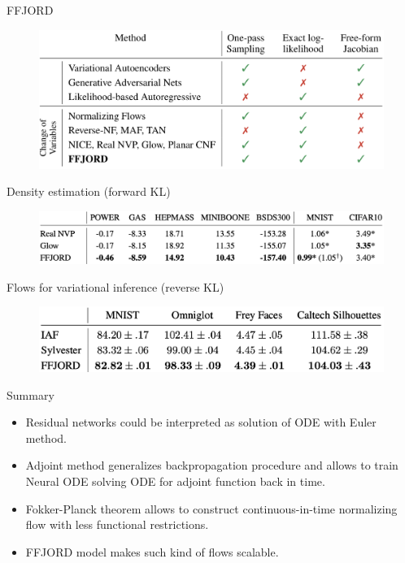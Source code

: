 \begin{frame}{FFJORD}
	\begin{figure}
		\centering
		\includegraphics[width=0.75\linewidth]{figs/flow_comparison.png}
	\end{figure}
	\vspace{-0.4cm}
	\begin{block}{Density estimation (forward KL)}
		\vspace{-0.2cm}
		\begin{figure}
			\centering
			\includegraphics[width=0.8\linewidth]{figs/ffjord_forward}
		\end{figure}
		\vspace{-0.5cm}
	\end{block}
	\begin{block}{Flows for variational inference (reverse KL)}
		\vspace{-0.2cm}
		\begin{figure}
			\centering
			\includegraphics[width=0.8\linewidth]{figs/ffjord_reverse}
		\end{figure}
	\end{block}

\end{frame}
\begin{frame}{Summary}
	\begin{itemize}
		\item Residual networks could be interpreted as solution of ODE with Euler method.
		\vfill
		\item Adjoint method generalizes backpropagation procedure and allows to train Neural ODE solving ODE for adjoint function back in time.
		\vfill
		\item Fokker-Planck theorem allows to construct continuous-in-time normalizing flow with less functional restrictions.
		\vfill
		\item FFJORD model makes such kind of flows scalable.
	\end{itemize}
\end{frame}
 